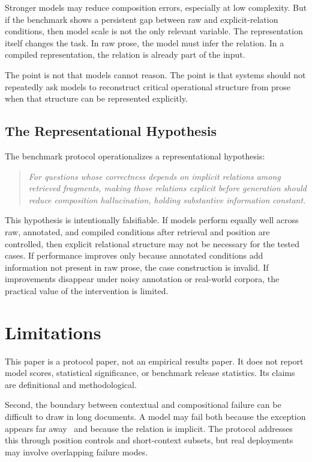 \documentclass[11pt]{article}
\begin{document}
Stronger models may reduce composition errors, especially at low complexity. But if the benchmark shows a persistent gap between raw and explicit-relation conditions, then model scale is not the only relevant variable. The representation itself changes the task. In raw prose, the model must infer the relation. In a compiled representation, the relation is already part of the input.

The point is not that models cannot reason. The point is that systems should not repeatedly ask models to reconstruct critical operational structure from prose when that structure can be represented explicitly.

\subsection{The Representational Hypothesis}

The benchmark protocol operationalizes a representational hypothesis:

\begin{quote}
\emph{For questions whose correctness depends on implicit relations among retrieved fragments, making those relations explicit before generation should reduce composition hallucination, holding substantive information constant.}
\end{quote}

This hypothesis is intentionally falsifiable. If models perform equally well across raw, annotated, and compiled conditions after retrieval and position are controlled, then explicit relational structure may not be necessary for the tested cases. If performance improves only because annotated conditions add information not present in raw prose, the case construction is invalid. If improvements disappear under noisy annotation or real-world corpora, the practical value of the intervention is limited.

\section{Limitations}

This paper is a protocol paper, not an empirical results paper. It does not report model scores, statistical significance, or benchmark release statistics. Its claims are definitional and methodological.

Second, the boundary between contextual and compositional failure can be difficult to draw in long documents. A model may fail both because the exception appears far away~\cite{liu2024lost} and because the relation is implicit. The protocol addresses this through position controls and short-context subsets, but real deployments may involve overlapping failure modes.
\end{document}
